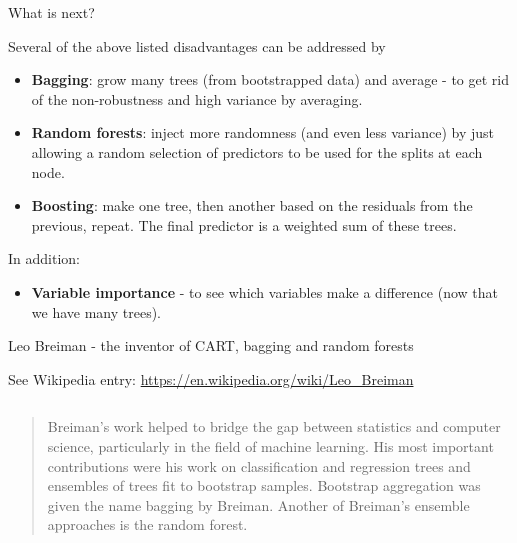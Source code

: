 \documentclass[
  10pt,
  ignorenonframetext,
]{beamer}
\providecommand{\tightlist}{%
  \setlength{\itemsep}{0pt}\setlength{\parskip}{0pt}}
\begin{document}
\begin{frame}
\begin{block}{What is next?}
\protect\hypertarget{what-is-next}{}
\vspace{2mm}

Several of the above listed disadvantages can be addressed by
\vspace{2mm}

\begin{itemize}
\item
  \textbf{Bagging}: grow many trees (from bootstrapped data) and average
  - to get rid of the non-robustness and high variance by averaging.
\item
  \textbf{Random forests}: inject more randomness (and even less
  variance) by just allowing a random selection of predictors to be used
  for the splits at each node.
\item
  \textbf{Boosting}: make one tree, then another based on the residuals
  from the previous, repeat. The final predictor is a weighted sum of
  these trees.
\end{itemize}

\vspace{2mm}

In addition:

\vspace{2mm}

\begin{itemize}
\tightlist
\item
  \textbf{Variable importance} - to see which variables make a
  difference (now that we have many trees).
\end{itemize}
\end{block}
\end{frame}

\begin{frame}
\begin{block}{Leo Breiman - the inventor of CART, bagging and random
forests}
\protect\hypertarget{leo-breiman---the-inventor-of-cart-bagging-and-random-forests}{}
\(~\)

\vspace{1mm}

See Wikipedia entry: \url{https://en.wikipedia.org/wiki/Leo_Breiman}

\vspace{1mm}

\(~\)

\begin{quote}
Breiman's work helped to bridge the gap between statistics and computer science, particularly in the field of machine learning. His most important contributions were his work on classification and regression trees and ensembles of trees fit to bootstrap samples. Bootstrap aggregation was given the name bagging by Breiman. Another of Breiman's ensemble approaches is the random forest. 
\end{quote}
\end{block}
\end{frame}
\end{document}
